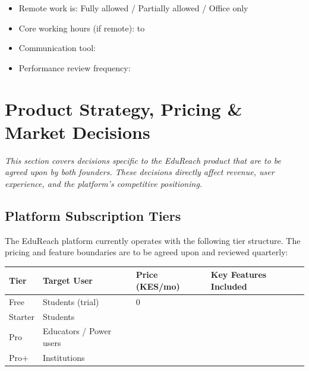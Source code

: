 \documentclass[12pt,a4paper]{article}
\newcommand{\blank}[1][5.5cm]{\underline{\hspace{#1}}}
\begin{document}
\begin{itemize}
  \item Remote work is: \quad Fully allowed \;/\; Partially allowed \;/\; Office only
  \item Core working hours (if remote): \blank[4cm] to \blank[4cm]
  \item Communication tool: \blank[4cm]
  \item Performance review frequency: \blank[4cm]
\end{itemize}

\section{Product Strategy, Pricing \& Market Decisions}

\begin{notebox}
\textit{This section covers decisions specific to the EduReach product that are to be agreed upon by both founders. These decisions directly affect revenue, user experience, and the platform's competitive positioning.}
\end{notebox}

\subsection{Platform Subscription Tiers}

The EduReach platform currently operates with the following tier structure. The pricing and feature boundaries are to be agreed upon and reviewed quarterly:

\begin{tabularx}{\linewidth}{L{2.5cm} C{2.5cm} C{2.5cm} X}
  \toprule
  \textbf{Tier} & \textbf{Target User} & \textbf{Price (KES/mo)} & \textbf{Key Features Included} \\
  \midrule
  Free       & Students (trial)    & 0                  & \blank[6cm] \\[0.5em]
  Starter    & Students            & \blank[1.5cm]      & \blank[6cm] \\[0.5em]
  Pro        & Educators / Power users & \blank[1.5cm]  & \blank[6cm] \\[0.5em]
  Pro+       & Institutions        & \blank[1.5cm]      & \blank[6cm] \\
  \bottomrule
\end{tabularx}
\end{document}
